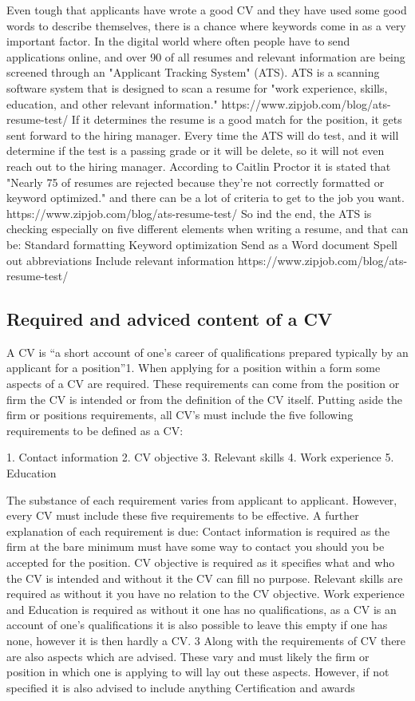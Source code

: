 Even tough that applicants have wrote a good CV and they have used some good words to describe themselves, 
there is a chance where keywords come in as a very important factor. In the digital world where often people have to send applications online, and over 90 %
of all resumes and relevant information are being screened through an "Applicant Tracking System" (ATS). ATS is a scanning software system 
that is designed to scan a resume for "work experience, skills, education, and other relevant information." https://www.zipjob.com/blog/ats-resume-test/
If it determines the resume is a good match for the position, it gets sent forward to the hiring manager. 
Every time the ATS will do test, and it will determine if the test is a passing grade or it will be delete, so it will not even reach out to the hiring manager. 
According to Caitlin Proctor it is stated that "Nearly 75 %
of resumes are rejected because they’re not correctly formatted or keyword optimized." and there can be a lot of criteria 
to get to the job you want. https://www.zipjob.com/blog/ats-resume-test/
So ind the end, the ATS is checking especially on five different elements when writing a resume, and that can be:
Standard formatting
Keyword optimization
Send as a Word document
Spell out abbreviations
Include relevant information
https://www.zipjob.com/blog/ats-resume-test/ \\

\subsection{Required and adviced content of a CV}
A CV  is “a short account of one’s career of qualifications prepared typically by an applicant for a position”1. When applying for a position within a form some aspects of a CV are required. These requirements can come from the position or firm the CV is intended or from the definition of the CV itself.
Putting aside the firm or positions requirements, all CV’s must include the five following requirements to be defined as a CV:

1. Contact information
2. CV objective
3. Relevant skills
4. Work experience
5. Education

The substance of each requirement varies from applicant to applicant. However, every CV must include these five requirements to be effective. A further explanation of each requirement is due:
Contact information is required as the firm at the bare minimum must have some way to contact you should you be accepted for the position. CV objective is required as it specifies what and who the CV is intended and without it the CV can fill no purpose. Relevant skills are required as without it you have no relation to the CV objective. Work experience and Education is required as without it one has no qualifications, as a CV is an account of one’s qualifications it is also possible to leave this empty if one has none, however it is then hardly a CV.  3
Along with the requirements of CV there are also aspects which are advised. These vary and must likely the firm or position in which one is applying to will lay out these aspects. However, if not specified it is also advised to include anything Certification and awards

